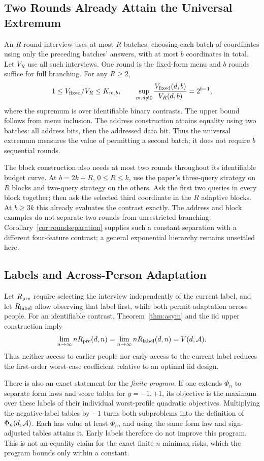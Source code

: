 

\subsection{Two Rounds Already Attain the Universal Extremum}\label{app:rounds}
An $R$-round interview uses at most $R$ batches, choosing each batch of coordinates using only the preceding batches' answers, with at most $b$ coordinates in total. Let $V_R$ use all such interviews. One round is the fixed-form menu and $b$ rounds suffice for full branching. For any $R\ge2$,
\[
 1\le V_{\rm fixed}/V_R\le K_{m,b},\qquad
 \sup_{m,d\ne0}\frac{V_{\rm fixed}(d,b)}{V_R(d,b)}=2^{b-1},
\]
where the supremum is over identifiable binary contrasts. The upper bound follows from menu inclusion. The address construction attains equality using two batches: all address bits, then the addressed data bit. Thus the universal extremum measures the value of permitting a second batch; it does not require $b$ sequential rounds.

The block construction also needs at most two rounds throughout its identifiable budget curve. At $b=2k+R$, $0\le R\le k$, use the paper's three-query strategy on $R$ blocks and two-query strategy on the others. Ask the first two queries in every block together; then ask the selected third coordinate in the $R$ adaptive blocks. At $b\ge3k$ this already evaluates the contrast exactly. The address and block examples do not separate two rounds from unrestricted branching. Corollary~\ref{cor:roundseparation} supplies such a constant separation with a different four-feature contrast; a general exponential hierarchy remains unsettled here.

\subsection{Labels and Across-Person Adaptation}
Let $R_{\rm pre}$ require selecting the interview independently of the current label, and let $R_{\rm label}$ allow observing that label first, while both permit adaptation across people. For an identifiable contrast, Theorem~\ref{thm:asym} and the iid upper construction imply
\[
 \lim_{n\to\infty}nR_{\rm pre}(d,n)
 =\lim_{n\to\infty}nR_{\rm label}(d,n)=V(d,\mathcal A).
\]
Thus neither access to earlier people nor early access to the current label reduces the first-order worst-case coefficient relative to an optimal iid design.

There is also an exact statement for the \emph{finite program}. If one extends $\Phi_n$ to separate form laws and score tables for $y=-1,+1$, its objective is the maximum over these labels of their individual worst-profile quadratic objectives. Multiplying the negative-label tables by $-1$ turns both subproblems into the definition of $\Phi_n(d,\mathcal A)$. Each has value at least $\Phi_n$, and using the same form law and sign-adjusted tables attains it. Early labels therefore do not improve this program. This is not an equality claim for the exact finite-$n$ minimax risks, which the program bounds only within a constant.

